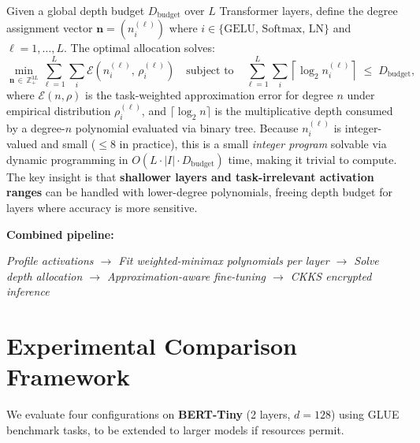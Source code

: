 \documentclass[12pt, a4paper]{article}
\begin{document}
\begin{contribution}
Given a global depth budget $D_{\mathrm{budget}}$ over $L$ Transformer layers, define the degree assignment vector $\mathbf{n} = (n_i^{(\ell)})$ where $i \in \{\mathrm{GELU},\,\mathrm{Softmax},\,\mathrm{LN}\}$ and $\ell = 1,\ldots,L$. The optimal allocation solves:
\begin{equation}
  \min_{\mathbf{n}\,\in\,\mathbb{Z}_{+}^{3L}}
  \sum_{\ell=1}^{L} \sum_{i}
  \mathcal{E}\!\left(n_i^{(\ell)},\, \rho_i^{(\ell)}\right)
  \quad\text{subject to}\quad
  \sum_{\ell=1}^{L} \sum_{i} \left\lceil \log_2 n_i^{(\ell)} \right\rceil \;\leq\; D_{\mathrm{budget}},
  \label{eq:depth_opt}
\end{equation}
where $\mathcal{E}(n, \rho)$ is the task-weighted approximation error for degree $n$ under empirical distribution $\rho_i^{(\ell)}$, and $\lceil \log_2 n \rceil$ is the multiplicative depth consumed by a degree-$n$ polynomial evaluated via binary tree. Because $n_i^{(\ell)}$ is integer-valued and small ($\leq 8$ in practice), this is a small \emph{integer program} solvable via dynamic programming in $O(L \cdot |I| \cdot D_{\mathrm{budget}})$ time, making it trivial to compute. The key insight is that \textbf{shallower layers and task-irrelevant activation ranges} can be handled with lower-degree polynomials, freeing depth budget for layers where accuracy is more sensitive.
\end{contribution}

\medskip
\noindent\textbf{Combined pipeline:}
\begin{center}
\textit{Profile activations $\to$ Fit weighted-minimax polynomials per layer $\to$ Solve depth allocation $\to$ Approximation-aware fine-tuning $\to$ CKKS encrypted inference}
\end{center}

\section{Experimental Comparison Framework}

We evaluate four configurations on \textbf{BERT-Tiny} (2 layers, $d=128$) using GLUE benchmark tasks, to be extended to larger models if resources permit.
\end{document}
